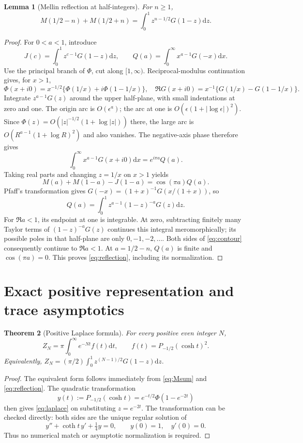 \documentclass[10pt]{article}
\newtheorem{theorem}{Theorem}
\newtheorem{lemma}[theorem]{Lemma}
\newcommand{\dd}{\mathrm d}
\begin{document}
\begin{lemma}[Mellin reflection at half-integers]
For $n\ge1$,
\begin{equation}
M(1/2-n)+M(1/2+n)
=\int_0^1 z^{n-1/2}G(1-z)\dd z.
\label{eq:reflection}
\end{equation}
\end{lemma}
\begin{proof}
For $0<a<1$, introduce
\[
J(c)=\int_0^1z^{c-1}G(1-z)\dd z,\qquad
Q(a)=\int_0^\infty x^{a-1}G(-x)\dd x.
\]
Use the principal branch of $\Phi$, cut along $[1,\infty)$.
Reciprocal-modulus continuation \cite{dlmf} gives, for $x>1$,
\[
\Phi(x+i0)=x^{-1/2}\{\Phi(1/x)+i\Phi(1-1/x)\},
\quad
\Re G(x+i0)=x^{-1}\{G(1/x)-G(1-1/x)\}.
\]
Integrate $z^{a-1}G(z)$ around the upper half-plane, with small
indentations at zero and one. The origin arc is $O(\epsilon^a)$;
the arc at one is $O(\epsilon(1+|\log\epsilon|)^2)$.
Since $\Phi(z)=O(|z|^{-1/2}(1+\log|z|))$ there, the large arc
is $O(R^{a-1}(1+\log R)^2)$ and also vanishes.
The negative-axis phase therefore gives
\[
\int_0^\infty x^{a-1}G(x+i0)\dd x=e^{i\pi a}Q(a).
\]
Taking real parts and changing $z=1/x$ on $x>1$ yields
\begin{equation}
M(a)+M(1-a)-J(1-a)=\cos(\pi a)Q(a).
\label{eq:contour}
\end{equation}
Pfaff's transformation gives
$G(-x)=(1+x)^{-1}G(x/(1+x))$, so
\[
Q(a)=\int_0^1z^{a-1}(1-z)^{-a}G(z)\dd z.
\]
For $\Re a<1$, its endpoint at one is integrable. At zero,
subtracting finitely many Taylor terms of $(1-z)^{-a}G(z)$
continues this integral meromorphically; its possible poles in that
half-plane are only $0,-1,-2,\ldots$.
Both sides of \eqref{eq:contour} consequently continue to $\Re a<1$.
At $a=1/2-n$, $Q(a)$ is finite and $\cos(\pi a)=0$.
This proves \eqref{eq:reflection}, including its normalization.
\end{proof}

\section{Exact positive representation and trace asymptotics}
\begin{theorem}[Positive Laplace formula]
For every positive even integer $N$,
\begin{equation}
\boxed{\quad Z_N=\pi\int_0^\infty e^{-Nt}f(t)\dd t,
\qquad f(t)=P_{-1/2}(\cosh t)^2.\quad}
\label{eq:laplace}
\end{equation}
Equivalently,
$Z_N=(\pi/2)\int_0^1 z^{(N-1)/2}G(1-z)\dd z$.
\end{theorem}
\begin{proof}
The equivalent form follows immediately from \eqref{eq:Msum} and
\eqref{eq:reflection}. The quadratic transformation
\[
y(t):=P_{-1/2}(\cosh t)=e^{-t/2}\Phi(1-e^{-2t})
\]
then gives \eqref{eq:laplace} on substituting $z=e^{-2t}$.
The transformation can be checked directly: both sides are the unique
regular solution of
\begin{equation}
y''+\coth t\,y'+\tfrac14 y=0,\qquad y(0)=1,\quad y'(0)=0.
\label{eq:yode}
\end{equation}
Thus no numerical match or asymptotic normalization is required.
\end{proof}
\end{document}
